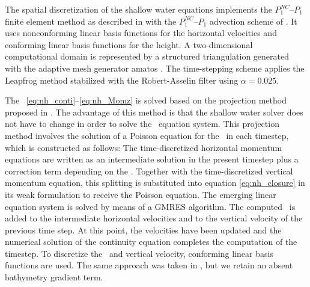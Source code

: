 The spatial discretization of the shallow water equations implements the $P^{NC}_1$--$P_1$ finite element method as described in \cite{Hanert.2005, LeRouxPouliot.2008} with the $P^{NC}_1$--$P_1$ advection scheme of \cite{Androsov.2011}. It uses nonconforming linear basis functions for the horizontal velocities and conforming linear basis functions for the height. A two-dimensional computational domain is represented by a structured triangulation generated with the adaptive mesh generator amatos \cite{Behrens.2005}. The time-stepping scheme applies the Leapfrog method stabilized with the Robert-Asselin filter \cite{Asselin.1972} using $\alpha=0.025$.

The \danheswe\ \eqref{eq:nh_conti}--\eqref{eq:nh_Momz} is solved based on the projection method proposed in \cite{StellingZijlema.2003}. The advantage of this method is that the shallow water solver does not have to change in order to solve the \nh\ equation system. This projection method involves the solution of a Poisson equation for the \nhp\ in each timestep, which is constructed as follows: The time-discretized horizontal momentum equations are written as an intermediate solution in the present timestep plus a correction term depending on the \nhp. Together with the time-discretized vertical momentum equation, this splitting is substituted into equation \eqref{eq:nh_closure} in its weak formulation to receive the Poisson equation. The emerging linear equation system is solved by means of a GMRES algorithm. The computed \nhp\ is added to the intermediate horizontal velocities and to the vertical velocity of the previous time step. At this point, the velocities have been updated and the numerical solution of the continuity equation completes the computation of the timestep.
To discretize the \nhp\ and vertical velocity, conforming linear basis functions are used. The same approach was taken in \cite{Fuchs.2013}, but we retain an absent bathymetry gradient term. 